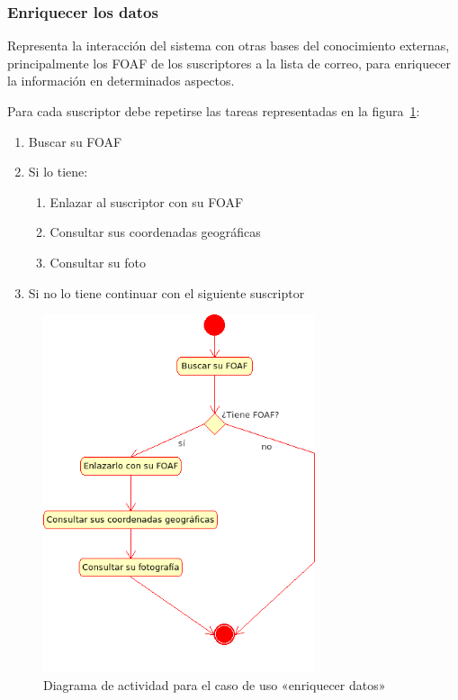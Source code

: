 \subsubsection{Enriquecer los datos}

Representa la interacción del sistema con otras bases del conocimiento externas, 
principalmente los FOAF de los suscriptores a la lista de correo, para enriquecer 
la información en determinados aspectos.

Para cada suscriptor debe repetirse las tareas representadas en la 
figura~\ref{fig:uml:enriquecer}:

\begin{enumerate}
  \item Buscar su FOAF
  \item Si lo tiene:
	\begin{enumerate}
	  \item	Enlazar al suscriptor con su FOAF
	  \item Consultar sus coordenadas geográficas
	  \item Consultar su foto
	\end{enumerate}
  \item Si no lo tiene continuar con el siguiente suscriptor
\end{enumerate}

\begin{figure}[ht]
 	\centering
	\includegraphics[width=8cm]{images/uml/casos-uso/enriquecer.png}
	\caption{Diagrama de actividad para el caso de uso «enriquecer datos»}
	\label{fig:uml:enriquecer}
\end{figure}

